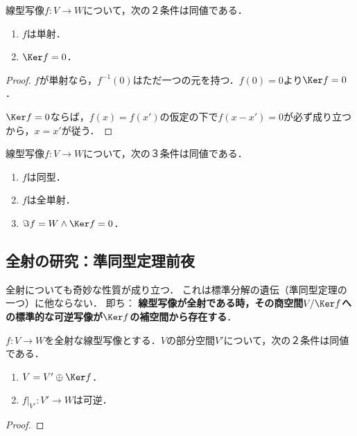 \documentclass[uplatex, dvipdfmx]{jsreport}
\begin{document}
\begin{proposition}[単射の特徴付け]\label{prop-characterization-of-monos-in-terms-of-Kernel}
    線型写像$f:V\to W$について，次の２条件は同値である．
    \begin{enumerate}
        \item $f$は単射．
        \item $\Ker f=0$．
    \end{enumerate}
\end{proposition}
\begin{proof}
    $f$が単射なら，$f^{-1}(0)$はただ一つの元を持つ．$f(0)=0$より$\Ker f=0$．

    $\Ker f=0$ならば，$f(x)=f(x')$の仮定の下で$f(x-x')=0$が必ず成り立つから，$x=x'$が従う．
\end{proof}

\begin{corollary}[可逆性と全単射は同値]\label{cor-invertible-if-全単射}
    線型写像$f:V\to W$について，次の３条件は同値である．
    \begin{enumerate}
        \item $f$は同型．
        \item $f$は全単射．
        \item $\Im f=W\land\Ker f=0$．
    \end{enumerate}
\end{corollary}

\subsection{全射の研究：準同型定理前夜}

\begin{tcolorbox}[colframe=ForestGreen, colback=ForestGreen!10!white, breakable]
    全射についても奇妙な性質が成り立つ．
    これは標準分解の遺伝（準同型定理の一つ）に他ならない．
    即ち：
    \textbf{線型写像が全射である時，その商空間$V/\Ker f$への標準的な可逆写像が$\Ker f$の補空間から存在する}．
\end{tcolorbox}

\begin{proposition}[準同型定理へ向けて]\label{prop-pre-homomorphism-thm}
    $f:V\to W$を全射な線型写像とする．$V$の部分空間$V'$について，次の２条件は同値である．
    \begin{enumerate}
        \item $V=V'\oplus\Ker f$．
        \item $f|_{V'}:V'\to W$は可逆．
    \end{enumerate}
\end{proposition}
\begin{proof}
    
\end{proof}
\end{document}
